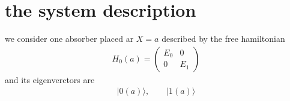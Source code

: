 \section{the system description}\label{sec:tls-one-absorber}
we consider one absorber placed ar $X=a$ described by the free hamiltonian
\begin{align}
    H_0(a) = \left(
        \begin{array}{cc}E_0&0\\0&E_1
    \end{array}\right)
\end{align}
and its eigenverctors are
\begin{align}
    |0(a)\rangle,\qquad |1(a)\rangle
\end{align}
